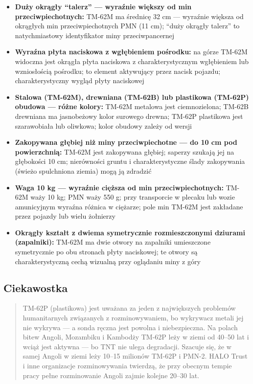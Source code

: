 \documentclass[12pt,oneside]{book}
\providecommand{\tightlist}{%
  \setlength{\itemsep}{0pt}\setlength{\parskip}{0pt}}
\begin{document}
\begin{itemize}
\tightlist
\item
  \textbf{Duży okrągły ``talerz'' --- wyraźnie większy od min
  przeciwpiechotnych:} TM-62M ma średnicę 32 cm --- wyraźnie większa od
  okrągłych min przeciwpiechotnych PMN (11 cm); ``duży okrągły talerz''
  to natychmiastowy identyfikator miny przeciwpancernej
\item
  \textbf{Wyraźna płyta naciskowa z wgłębieniem pośrodku:} na górze
  TM-62M widoczna jest okrągła płyta naciskowa z charakterystycznym
  wgłębieniem lub wzniosłością pośrodku; to element aktywujący przez
  nacisk pojazdu; charakterystyczny wygląd płyty naciskowej
\item
  \textbf{Stalowa (TM-62M), drewniana (TM-62B) lub plastikowa (TM-62P)
  obudowa --- różne kolory:} TM-62M metalowa jest ciemnozielona; TM-62B
  drewniana ma jasnobeżowy kolor surowego drewna; TM-62P plastikowa jest
  szarawobiała lub oliwkowa; kolor obudowy zależy od wersji
\item
  \textbf{Zakopywana głębiej niż miny przeciwpiechotne --- do 10 cm pod
  powierzchnią:} TM-62M jest zakopywana głębiej; saperzy szukają jej na
  głębokości 10 cm; nierówności gruntu i charakterystyczne ślady
  zakopywania (świeżo spulchniona ziemia) mogą ją zdradzić
\item
  \textbf{Waga 10 kg --- wyraźnie cięższa od min przeciwpiechotnych:}
  TM-62M waży 10 kg; PMN waży 550 g; przy transporcie w plecaku lub
  wozie amunicyjnym wyraźna różnica w ciężarze; pole min TM-62M jest
  zakładane przez pojazdy lub wielu żołnierzy
\item
  \textbf{Okrągły kształt z dwiema symetrycznie rozmieszczonymi dziurami
  (zapalniki):} TM-62M ma dwie otwory na zapalniki umieszczone
  symetrycznie po obu stronach płyty naciskowej; te otwory są
  charakterystyczną cechą wizualną przy oglądaniu miny z góry
\end{itemize}

\subsection{Ciekawostka}\label{ciekawostka-130}

\begin{quote}
TM-62P (plastikowa) jest uważana za jeden z największych problemów
humanitarnych związanych z rozminowywaniem, bo wykrywacz metali jej nie
wykrywa --- a sonda ręczna jest powolna i niebezpieczna. Na polach bitew
Angoli, Mozambiku i Kambodży TM-62P leży w ziemi od 40--50 lat i wciąż
jest aktywna --- bo TNT nie ulega degradacji. Szacuje się, że w samej
Angoli w ziemi leży 10--15 milionów TM-62P i PMN-2. HALO Trust i inne
organizacje rozminowywania twierdzą, że przy obecnym tempie pracy pełne
rozminowanie Angoli zajmie kolejne 20--30 lat.
\end{quote}
\end{document}
